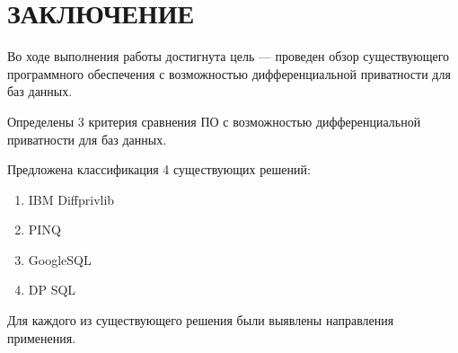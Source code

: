 \chapter*{ЗАКЛЮЧЕНИЕ}
Во ходе выполнения работы достигнута цель --- проведен обзор существующего программного обеспечения с возможностью дифференциальной приватности для баз данных.

Определены 3 критерия сравнения ПО с возможностью дифференциальной приватности для баз данных.

Предложена классификация 4 существующих решений:
\begin{enumerate}[label*=---]
	\item IBM Diffprivlib
	\item PINQ
	\item GoogleSQL
	\item DP SQL
\end{enumerate}

Для каждого из существующего решения были выявлены направления применения.
